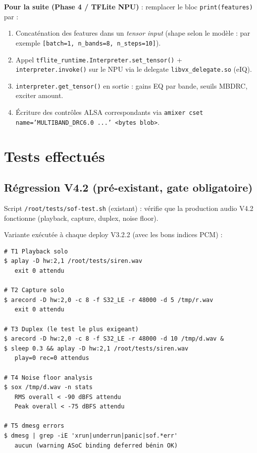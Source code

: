 \documentclass[11pt,a4paper]{article}
\begin{document}
\textbf{Pour la suite (Phase 4 / TFLite NPU)} : remplacer le bloc
\texttt{print(features)} par :
\begin{enumerate}[leftmargin=1.4em]
\item Concaténation des features dans un \emph{tensor input} (shape selon le
      modèle : par exemple \texttt{[batch=1, n\_bands=8, n\_steps=10]}).
\item Appel \texttt{tflite\_runtime.Interpreter.set\_tensor()} +
      \texttt{interpreter.invoke()} sur le NPU via le delegate
      \texttt{libvx\_delegate.so} (eIQ).
\item \texttt{interpreter.get\_tensor()} en sortie : gains EQ par bande,
      seuils MBDRC, exciter amount.
\item Écriture des contrôles ALSA correspondants via
      \texttt{amixer cset name='MULTIBAND\_DRC6.0 ...' <bytes blob>}.
\end{enumerate}

\section{Tests effectués}

\subsection{Régression V4.2 (pré-existant, gate obligatoire)}

Script \texttt{/root/tests/sof-test.sh} (existant) : vérifie que la production
audio V4.2 fonctionne (playback, capture, duplex, noise floor).

Variante exécutée à chaque deploy V3.2.2 (avec les bons indices PCM) :

\begin{lstlisting}
# T1 Playback solo
$ aplay -D hw:2,1 /root/tests/siren.wav
   exit 0 attendu

# T2 Capture solo
$ arecord -D hw:2,0 -c 8 -f S32_LE -r 48000 -d 5 /tmp/r.wav
   exit 0 attendu

# T3 Duplex (le test le plus exigeant)
$ arecord -D hw:2,0 -c 8 -f S32_LE -r 48000 -d 10 /tmp/d.wav &
$ sleep 0.3 && aplay -D hw:2,1 /root/tests/siren.wav
   play=0 rec=0 attendus

# T4 Noise floor analysis
$ sox /tmp/d.wav -n stats
   RMS overall < -90 dBFS attendu
   Peak overall < -75 dBFS attendu

# T5 dmesg errors
$ dmesg | grep -iE 'xrun|underrun|panic|sof.*err'
   aucun (warning ASoC binding deferred bénin OK)
\end{lstlisting}
\end{document}
